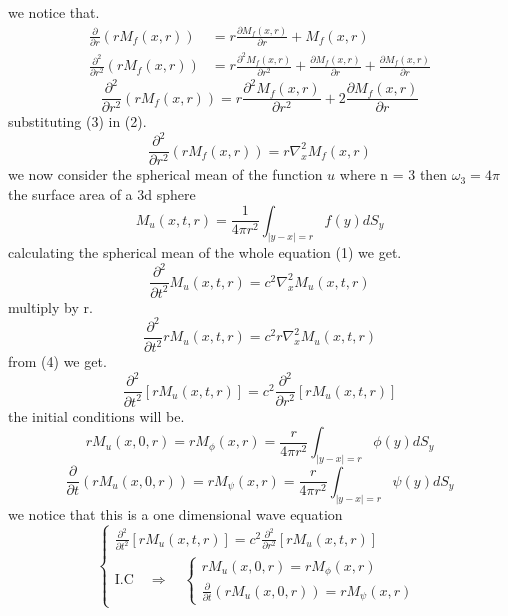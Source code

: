 \documentclass[]{article}
\begin{document}
we notice that.
\begin{align*}
\frac{\partial }{\partial r}\left(rM_f (x,r) \right) &= r\frac{\partial M_f(x,r)}{\partial r} +M_f (x,r)
\\
\frac{\partial^2 }{\partial r^2}\left(rM_f (x,r) \right) &= r\frac{\partial^2 M_f(x,r)}{\partial r^2} + \frac{\partial M_f(x,r)}{\partial r}  + \frac{\partial M_f(x,r)}{\partial r}
\end{align*}
\begin{equation}
\frac{\partial^2 }{\partial r^2}\left(rM_f (x,r) \right) = r\frac{\partial^2 M_f(x,r)}{\partial r^2} + 2\frac{\partial M_f(x,r)}{\partial r}
\end{equation}
substituting (3) in (2).
\begin{equation}
\frac{\partial^2 }{\partial r^2}\left(rM_f (x,r) \right) = r\nabla_{x}^{2} M_f (x,r)
\end{equation}
we now consider the spherical mean of the function $u$ where n = 3 then $\omega_3 = 4\pi$ the surface area of a 3d sphere
\[
    M_{u}(x,t,r) = \frac{1}{4\pi r^2} \int_{|y-x|=r} f(y)dS_y    
\]
calculating the spherical mean of the whole equation (1) we get.
\[
    \frac{\partial^2}{\partial t^2} M_{u}(x,t,r) = c^2 \nabla_{x}^{2}M_{u}(x,t,r)    
\]
multiply by r.
\[
    \frac{\partial^2}{\partial t^2} r M_{u}(x,t,r) = c^2 r\nabla_{x}^{2}M_{u}(x,t,r)    
\]
from (4) we get.
\begin{equation}
    \frac{\partial^2}{\partial t^2} \left[r M_u (x,t,r) \right] = c^2 \frac{\partial^2 }{\partial r^2}\left[r M_u (x,t,r) \right]    
\end{equation} 
the initial conditions will be.
\begin{equation}
rM_{u}(x,0,r) = rM_\phi(x,r) = \frac{r}{4\pi r^2} \int_{|y-x|=r}\phi(y)dS_y
\end{equation}
\begin{equation}
\frac{\partial}{\partial t}\left(rM_{u}(x,0,r)\right) = rM_\psi(x,r) = \frac{r}{4\pi r^2} \int_{|y-x|=r}\psi(y)dS_y
\end{equation}
we notice that this is a one dimensional wave equation 
\[
    \begin{cases}
        \displaystyle \frac{\partial^2}{\partial t^2} \left[r M_u (x,t,r) \right] = c^2 \frac{\partial^2 }{\partial r^2}\left[r M_u (x,t,r) \right]    
        \\
        \text{I.C} \quad \Longrightarrow \quad 
        \begin{cases}
            rM_{u}(x,0,r) = rM_\phi(x,r)
            \\
            \frac{\partial}{\partial t}\left(rM_{u}(x,0,r)\right) = rM_\psi(x,r)
        \end{cases}
    \end{cases}
\]
\end{document}

